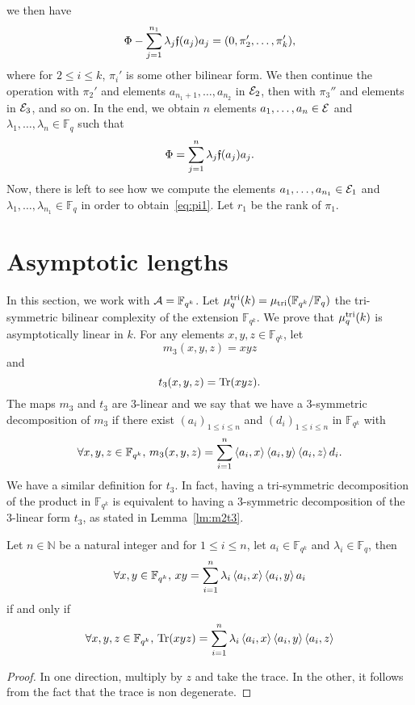 \documentclass[a4paper,11pt]{article}
\begin{document}
we then have
\[
  \Phi-\sum_{j=1}^{n_1}\lambda_j\mathfrak{f}(a_j)a_j = (0, \pi_2', \dots, \pi_k'), 
\]
where for $2\leq i \leq k$, $\pi_i'$ is some other bilinear form.
We then continue the operation with $\pi_2'$ and elements $a_{n_1+1}, \dots,
a_{n_2}$ in $\mathcal{E}_2$, then with $\pi_3''$ and elements in $\mathcal{E}_3$, and so on. In
the end, we obtain $n$ elements $a_1, \dots, a_n\in \mathcal{E}$ and $\lambda_1, \dots,
\lambda_n\in\mathbb{F}_q$ such that
\[
  \Phi = \sum_{j=1}^{n}\lambda_j\mathfrak{f}(a_j)a_j.
\]
Now, there is left to see how we compute the elements $a_1, \dots,
a_{n_1}\in\mathcal{E}_1$ and $\lambda_1, \dots, \lambda_{n_1}\in\mathbb{F}_q$ in order to
obtain~\eqref{eq:pi1}. Let $r_1$ be the rank of $\pi_1$.

\section{Asymptotic lengths}
\label{sec:asymptotic}
In this section, we work with $\mathcal{A}=\mathbb{F}_{q^k}$. Let
$\mu_{q}^{\text{tri}}(k)=\mu_{\text{tri}}(\mathbb{F}_{q^k}/\mathbb{F}_q)$ the tri-symmetric
bilinear complexity of the extension $\mathbb{F}_{q^k}$. We prove that
$\mu_{q}^{\text{tri}}(k)$ is asymptotically linear in $k$. For any elements $x, y, z\in\mathbb{F}_{q^k}$, let
\[
m_3(x, y, z) = xyz
\]
and
\[
t_3(x, y, z) = \operatorname{Tr}(xyz).
\]
The maps $m_3$ and $t_3$ are $3$-linear and we say that we have a $3$-symmetric
decomposition of $m_3$ if there exist $(a_i)_{1\leq i\leq n}$ and $(d_i)_{1\leq i\leq
n}$ in $\mathbb{F}_{q^k}$ with
\begin{equation}
    \forall x, y, z\in\mathbb{F}_{q^k},\,m_3(x, y, z) =
    \sum_{i=1}^n\left\langle a_i,x\right\rangle\left\langle a_i,y\right\rangle\left\langle a_i,z\right\rangle d_i.
  \label{eq:3-sym}
\end{equation}
We have a similar definition for $t_3$. In fact, having a tri-symmetric
decomposition of the product in $\mathbb{F}_{q^k}$ is equivalent to having a
$3$-symmetric decomposition of the $3$-linear form $t_3$, as stated in Lemma~\ref{lm:m2t3}.
\begin{lm}
  \label{lm:m2t3}
  Let $n\in\mathbb{N}$ be a natural integer and for $1\leq i \leq n$, let
  $a_i\in\mathbb{F}_{q^k}$ and $\lambda_i\in\mathbb{F}_q$, then
  \[
    \forall x, y\in\mathbb{F}_{q^k},\, xy =
    \sum_{i=1}^n\lambda_i\left\langle a_i,x\right\rangle\left\langle a_i,y\right\rangle a_i
  \]
  if and only if
  \[
    \forall x, y, z\in\mathbb{F}_{q^k},\,\operatorname{Tr}(xyz) =
    \sum_{i=1}^n\lambda_i\left\langle a_i,x\right\rangle\left\langle a_i,y\right\rangle\left\langle a_i,z\right\rangle
  \]
\end{lm}
\begin{proof}
  In one direction, multiply by $z$ and take the trace. In the other, it follows
  from the fact that the trace is non degenerate.
\end{proof}
\end{document}
